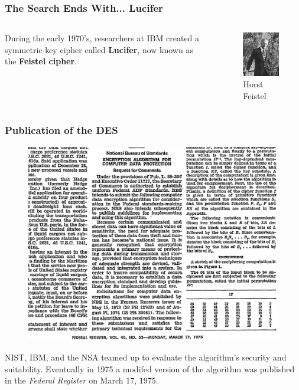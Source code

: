 \documentclass{beamer}
\newcommand{\<}{\langle}
\renewcommand{\>}{\rangle}
\begin{document}
\begin{frame}
\frametitle{The Search Ends With... Lucifer}
\begin{columns}
\begin{column}{.5\textwidth}
During the early 1970's, researchers at IBM created a symmetric-key cipher called \textbf{Lucifer}, now known as the \textbf{Feistel cipher}.
\end{column}

\begin{column}{.5\textwidth}
\begin{figure}
\includegraphics[scale=2]{IMG/feistel.jpg}
\caption{\scriptsize Horst Feistel}
\end{figure}
\end{column}
\end{columns}
\end{frame}


\begin{frame}
\frametitle{Publication of the DES}

\begin{figure}
\includegraphics[scale=.4]{IMG/pub}
\end{figure}\small
NIST, IBM, and the NSA teamed up to evaluate the algorithm's security and suitability. Eventually in 1975 a modifed version of the algorithm was published in the \emph{Federal Register} on March 17, 1975. 
\end{frame}
\end{document}
